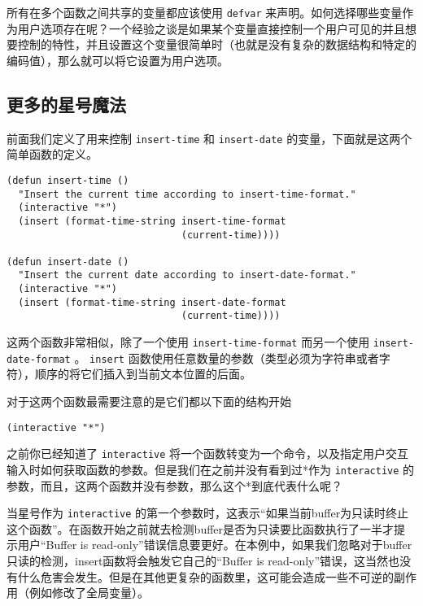 所有在多个函数之间共享的变量都应该使用 \texttt{defvar} 来声明。如何选择哪些变量作为用户选项存在呢？一个经验之谈是如果某个变量直接控制一个用户可见的并且想要控制的特性，并且设置这个变量很简单时（也就是没有复杂的数据结构和特定的编码值），那么就可以将它设置为用户选项。

\subsection{更多的星号魔法}
\label{section:04-More-Asterisk-Magic}

前面我们定义了用来控制 \texttt{insert-time} 和 \texttt{insert-date} 的变量，下面就是这两个简单函数的定义。

\begin{verbatim}
(defun insert-time ()
  "Insert the current time according to insert-time-format."
  (interactive "*")
  (insert (format-time-string insert-time-format
                              (current-time))))

(defun insert-date ()
  "Insert the current date according to insert-date-format."
  (interactive "*")
  (insert (format-time-string insert-date-format
                              (current-time))))
\end{verbatim}

这两个函数非常相似，除了一个使用 \texttt{insert-time-format} 而另一个使用 \texttt{insert-date-format} 。 \texttt{insert} 函数使用任意数量的参数（类型必须为字符串或者字符），顺序的将它们插入到当前文本位置的后面。

对于这两个函数最需要注意的是它们都以下面的结构开始

\begin{verbatim}
(interactive "*")
\end{verbatim}

之前你已经知道了 \texttt{interactive} 将一个函数转变为一个命令，以及指定用户交互输入时如何获取函数的参数。但是我们在之前并没有看到过*作为 \texttt{interactive} 的参数，而且，这两个函数并没有参数，那么这个*到底代表什么呢？

当星号作为 \texttt{interactive} 的第一个参数时，这表示“如果当前buffer为只读时终止这个函数”。在函数开始之前就去检测buffer是否为只读要比函数执行了一半才提示用户“Buffer is read-only”错误信息要更好。在本例中，如果我们忽略对于buffer只读的检测，insert函数将会触发它自己的“Buffer is read-only”错误，这当然也没有什么危害会发生。但是在其他更复杂的函数里，这可能会造成一些不可逆的副作用（例如修改了全局变量）。

